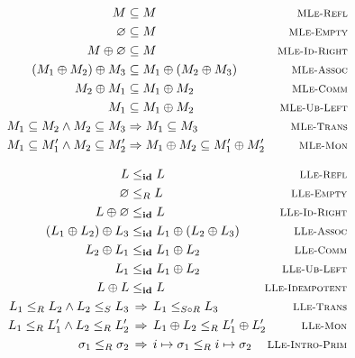\begin{figure} [t]
    \noindent
    \vspace*{-17pt}
    \begin{align*}
        M &\subseteq M &
            \rulename{MLe-Refl} \\
        \varnothing &\subseteq M &
            \rulename{MLe-Empty} \\
        M \oplus \varnothing &\subseteq M &
            \rulename{MLe-Id-Right} \\
        (M_1 \oplus M_2) \oplus M_3 &\subseteq M_1 \oplus (M_2 \oplus M_3) &
            \rulename{MLe-Assoc} \\
        M_2 \oplus M_1 &\subseteq M_1 \oplus M_2 &
            \rulename{MLe-Comm} \\
        M_1 &\subseteq M_1 \oplus M_2 &
            \rulename{MLe-Ub-Left} \\
        M_1 \subseteq M_2 \wedge M_2 \subseteq M_3
            &\Rightarrow M_1 \subseteq M_3 &
            \rulename{MLe-Trans} \\
        M_1 \subseteq M_1' \wedge M_2 \subseteq M_2'
            &\Rightarrow M_1 \oplus M_2 \subseteq M_1' \oplus M_2'
            &\rulename{MLe-Mon}
    \end{align*}

    \vspace{1em}
    \noindent
    \vspace*{-17pt}
    \begin{align*}
        L &\lpath{\id} L &
            \rulename{LLe-Refl} \\
        \varnothing &\lpath{R} L &
            \rulename{LLe-Empty} \\
        L \oplus \varnothing &\lpath{\id} L &
            \rulename{LLe-Id-Right} \\
        (L_1 \oplus L_2) \oplus L_3 &\lpath{\id} L_1 \oplus (L_2 \oplus L_3) &
            \rulename{LLe-Assoc} \\
        L_2 \oplus L_1 &\lpath{\id} L_1 \oplus L_2 &
            \rulename{LLe-Comm} \\
        L_1 &\lpath{\id} L_1 \oplus L_2 &
            \rulename{LLe-Ub-Left} \\
        L \oplus L &\lpath{\id} L &
            \rulename{LLe-Idempotent} \\
        L_1 \lpath{R} L_2 \wedge L_2 \lpath{S} L_3 &\,\Rightarrow\,
            L_1 \lpath{S \circ R} L_3 &
            \rulename{LLe-Trans} \\
        L_1 \lpath{R} L_1' \wedge L_2 \lpath{R} L_2' &\,\Rightarrow\,
            L_1 \oplus L_2 \lpath{R} L_1' \oplus L_2' \hspace{-2em} &
            \rulename{LLe-Mon} \\
        \sigma_1 \lpath{R} \sigma_2 &\,\Rightarrow\,
            i \mapsto \sigma_1 \lpath{R} i \mapsto \sigma_2 &
            \rulename{LLe-Intro-Prim}
    \end{align*}


\end{figure}
